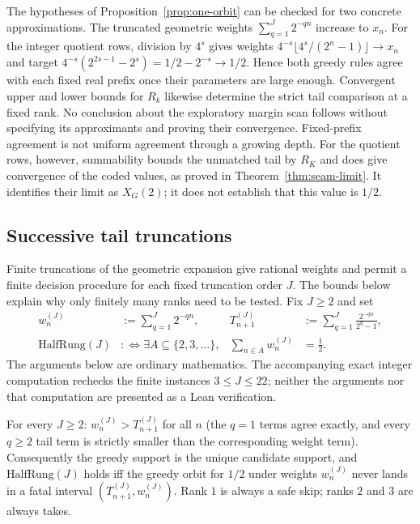 \begin{rem}
The hypotheses of Proposition~\ref{prop:one-orbit} can be checked for
two concrete approximations.  The truncated geometric weights
$\sum_{q=1}^{J}2^{-qn}$ increase to $x_n$.  For the integer quotient
rows, division by $4^s$ gives weights
$4^{-s}\lfloor4^s/(2^n-1)\rfloor\to x_n$ and target
$4^{-s}(2^{2s-1}-2^s)=1/2-2^{-s}\to1/2$.
Hence both greedy rules agree with each fixed real prefix once their
parameters are large enough.  Convergent upper and lower bounds for
$R_k$ likewise determine the strict tail comparison at a fixed rank.
No conclusion about the exploratory margin scan follows without specifying
its approximants and proving their convergence.  Fixed-prefix agreement is not uniform agreement through a growing
depth.  For the quotient rows, however, summability bounds the unmatched
tail by $R_K$ and does give convergence of the coded values, as proved
in Theorem~\ref{thm:seam-limit}.  It identifies their limit as
$X_G(2)$; it does not establish that this value is $1/2$.
\end{rem}

\subsection*{Successive tail truncations}

Finite truncations of the geometric expansion give rational weights
and permit a finite decision procedure for each fixed truncation
order $J$.  The bounds below explain why only finitely many ranks
need to be tested.  Fix $J\ge2$ and set
\[
\begin{aligned}
w_n^{(J)}&:=\sum_{q=1}^{J}2^{-qn}, &
T_{n+1}^{(J)}&:=\sum_{q=1}^{J}\frac{2^{-qn}}{2^q-1},\\
\mathrm{HalfRung}(J)&:\Longleftrightarrow
\exists A\subseteq\{2,3,\ldots\},&
\sum_{n\in A}w_n^{(J)}&=\tfrac12.
\end{aligned}
\]
The arguments below are ordinary mathematics.  The accompanying exact
integer computation rechecks the finite instances $3\le J\le22$; neither
the arguments nor that computation are presented as a Lean verification.

\begin{lem}
\label{lem:tr-forced-greedy}
For every $J\ge2$: $w_n^{(J)}>T_{n+1}^{(J)}$ for all $n$ (the $q=1$ terms agree exactly, and every
$q\ge2$ tail term is strictly smaller than the corresponding weight term). Consequently the greedy support is the unique candidate support, and
$\mathrm{HalfRung}(J)$ holds iff the greedy orbit for $1/2$ under weights $w_n^{(J)}$ never lands in
a fatal interval $(T_{n+1}^{(J)},w_n^{(J)})$. Rank $1$ is always a safe skip; ranks $2$ and $3$ are
always takes.
\end{lem}


